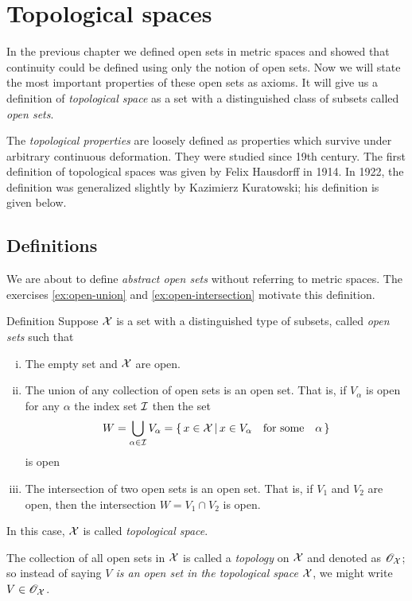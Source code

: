 \chapter{Topological spaces}


In the previous chapter we defined open sets in metric spaces 
and showed that continuity could be defined using only the notion of open sets.
Now we will state the most important properties of these open sets as axioms.
It will give us a definition of \emph{topological space} as a set with a distinguished class of subsets called \emph{open sets}.

The \emph{topological properties} are loosely defined as properties which survive under arbitrary continuous deformation.
They were studied since 19th century.
The first definition of topological spaces was given by Felix Hausdorff in 1914.
In 1922, the definition was generalized slightly by Kazimierz Kuratowski; his definition is given below.

\section{Definitions}

We are about to define \emph{abstract open sets} without referring to metric spaces.
The exercises \ref{ex:open-union} and \ref{ex:open-intersection} motivate this definition.

\begin{thm}{Definition}\label{def:top-space}
Suppose $\mathcal{X}$ is a set 
with a distinguished type of subsets, called \emph{open sets} such that
\begin{enumerate}[(i)] 
\item\label{def:top-space:empty} The empty set and $\mathcal{X}$ are open.
\item\label{def:top-space:u} The union of any collection of open sets is an open set.
That is, if $V_\alpha$ is open for any $\alpha$ the index set $\mathcal{I}$ 
then the set
\[W=\bigcup_{\alpha\in \mathcal{I}} V_\alpha
=
\left\{\,{x\in \mathcal{X}}\,\middle|\,{x\in V_\alpha\quad\text{for some}\quad\alpha}\,\right\}\]
is open
\item\label{def:top-space:n} The intersection of two open sets is an open set.  
That is, if $V_1$ and $V_2$ are open, then the intersection $W=V_1 \cap V_2$ is open. 
\end{enumerate}
In this case, $\mathcal{X}$ is called \emph{topological space}.

The collection of all open sets in  $\mathcal{X}$ is called a \emph{topology} on $\mathcal{X}$ and denoted as $\mathscr{O}_{\mathcal{X}}$;
so instead of saying \emph{$V$ is an open set in the topological space $\mathcal{X}$}, we might write $V\in \mathscr{O}_{\mathcal{X}}$.
\end{thm}

